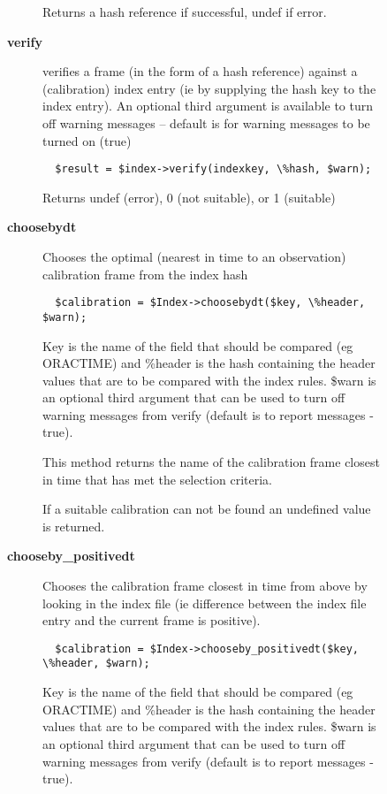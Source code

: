 \begin{description}
\begin{description}
\begin{description}
Returns a hash reference if successful, undef if error.


\item[{\textbf{verify}}] \mbox{}

verifies a frame (in the form of a hash reference) against a
(calibration) index entry (ie by supplying the hash key to the index
entry). An optional third argument is available to turn off warning
messages -- default is for warning messages to be turned on (true)

\begin{verbatim}
  $result = $index->verify(indexkey, \%hash, $warn);
\end{verbatim}


Returns undef (error), 0 (not suitable), or 1 (suitable)


\item[{\textbf{choosebydt}}] \mbox{}

Chooses the optimal (nearest in time to an observation) calibration
frame from the index hash

\begin{verbatim}
  $calibration = $Index->choosebydt($key, \%header, $warn);
\end{verbatim}


Key is the name of the field that should be compared (eg ORACTIME)
and \%header is the hash containing the header values that are to
be compared with the index rules. \$warn is an optional third argument
that can be used to turn off warning messages from verify (default
is to report messages - true).



This method returns the name of the calibration frame closest in
time that has met the selection criteria.



If a suitable calibration can not be found an undefined value is returned.


\item[{\textbf{chooseby\_positivedt}}] \mbox{}

Chooses the calibration frame closest in time from above by looking
in the index file (ie difference between the index file entry and
the current frame is positive).

\begin{verbatim}
  $calibration = $Index->chooseby_positivedt($key, \%header, $warn);
\end{verbatim}


Key is the name of the field that should be compared (eg ORACTIME)
and \%header is the hash containing the header values that are to
be compared with the index rules. \$warn is an optional third argument
that can be used to turn off warning messages from verify (default
is to report messages - true).




\end{description}
\end{description}
\end{description}
